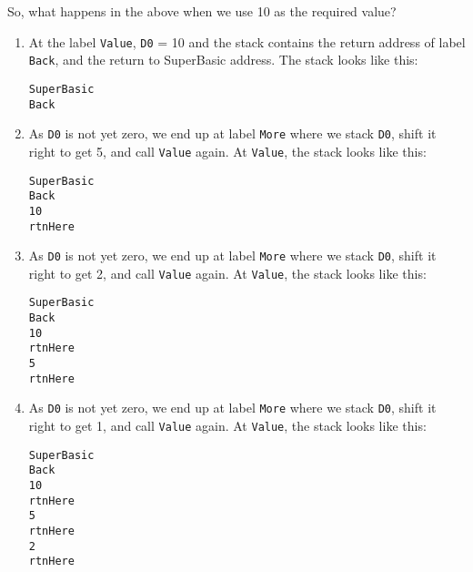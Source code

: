So, what happens in the above when we use 10 as the required value?
\begin{enumerate}
\item At the label \lstinline!Value!, \lstinline!D0! = 10 and the stack
contains the return address of label \lstinline!Back!, and the return
to SuperBasic address. The stack looks like this:

\begin{lstlisting}[numbers=none]
SuperBasic
Back
\end{lstlisting}

\item As \lstinline!D0! is not yet zero, we end up at label \lstinline!More!
where we stack \lstinline!D0!, shift it right to get 5, and call
\lstinline!Value! again. At \lstinline!Value!, the stack looks like
this:

\begin{lstlisting}[numbers=none]
SuperBasic
Back
10
rtnHere
\end{lstlisting}

\item As \lstinline!D0! is not yet zero, we end up at label \lstinline!More!
where we stack \lstinline!D0!, shift it right to get 2, and call
\lstinline!Value! again. At \lstinline!Value!, the stack looks like
this:

\begin{lstlisting}[numbers=none]
SuperBasic
Back
10
rtnHere
5
rtnHere
\end{lstlisting}

\item As \lstinline!D0! is not yet zero, we end up at label \lstinline!More!
where we stack \lstinline!D0!, shift it right to get 1, and call
\lstinline!Value! again. At \lstinline!Value!, the stack looks like
this:

\begin{lstlisting}[numbers=none]
SuperBasic
Back
10
rtnHere
5
rtnHere
2
rtnHere
\end{lstlisting}


\end{enumerate}
